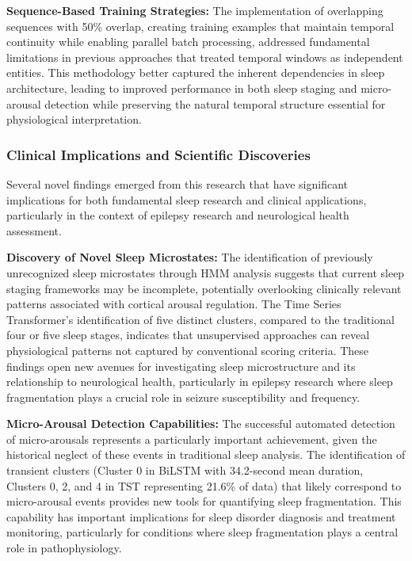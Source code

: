 \documentclass[a4paper,12pt,twoside]{article}
\begin{document}
\textbf{Sequence-Based Training Strategies:}
The implementation of overlapping sequences with 50\% overlap, creating training examples that maintain temporal continuity while enabling parallel batch processing, addressed fundamental limitations in previous approaches that treated temporal windows as independent entities. This methodology better captured the inherent dependencies in sleep architecture, leading to improved performance in both sleep staging and micro-arousal detection while preserving the natural temporal structure essential for physiological interpretation.

\subsubsection{Clinical Implications and Scientific Discoveries}

Several novel findings emerged from this research that have significant implications for both fundamental sleep research and clinical applications, particularly in the context of epilepsy research and neurological health assessment.

\textbf{Discovery of Novel Sleep Microstates:}
The identification of previously unrecognized sleep microstates through HMM analysis suggests that current sleep staging frameworks may be incomplete, potentially overlooking clinically relevant patterns associated with cortical arousal regulation. The Time Series Transformer's identification of five distinct clusters, compared to the traditional four or five sleep stages, indicates that unsupervised approaches can reveal physiological patterns not captured by conventional scoring criteria. These findings open new avenues for investigating sleep microstructure and its relationship to neurological health, particularly in epilepsy research where sleep fragmentation plays a crucial role in seizure susceptibility and frequency.

\textbf{Micro-Arousal Detection Capabilities:}
The successful automated detection of micro-arousals represents a particularly important achievement, given the historical neglect of these events in traditional sleep analysis. The identification of transient clusters (Cluster 0 in BiLSTM with 34.2-second mean duration, Clusters 0, 2, and 4 in TST representing 21.6\% of data) that likely correspond to micro-arousal events provides new tools for quantifying sleep fragmentation. This capability has important implications for sleep disorder diagnosis and treatment monitoring, particularly for conditions where sleep fragmentation plays a central role in pathophysiology.
\end{document}

